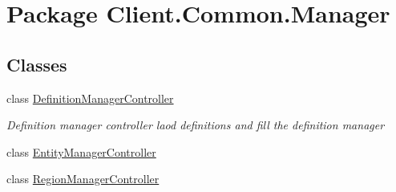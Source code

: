 \hypertarget{namespaceClient_1_1Common_1_1Manager}{\section{Package Client.\-Common.\-Manager}
\label{namespaceClient_1_1Common_1_1Manager}
}
\subsection*{Classes}
\begin{DoxyCompactItemize}
\item 
class \hyperlink{classClient_1_1Common_1_1Manager_1_1DefinitionManagerController}{Definition\-Manager\-Controller}
\begin{DoxyCompactList}\small\item\em Definition manager controller laod definitions and fill the definition manager \end{DoxyCompactList}\item 
class \hyperlink{classClient_1_1Common_1_1Manager_1_1EntityManagerController}{Entity\-Manager\-Controller}
\item 
class \hyperlink{classClient_1_1Common_1_1Manager_1_1RegionManagerController}{Region\-Manager\-Controller}
\end{DoxyCompactItemize}

